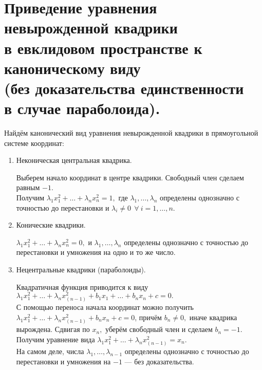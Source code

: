\documentclass[a4paper]{article}%
\renewcommand{\ab}{\par\noindent}%
\begin{document}
\section{Приведение уравнения невырожденной квадрики\\ в евклидовом пространстве к каноническому виду\\ (без
доказательства единственности\\ в случае параболоида).}
\label{q50}
Найдём канонический вид уравнения невырожденной квадрики в прямоугольной системе координат:
\begin{enumerate}
    \item Неконическая центральная квадрика.
    \ab Выберем начало координат в центре квадрики. Свободный член сделаем равным $-1$.\\
    Получим $\lambda_1x_1^2+\dots+\lambda_nx_n^2=1,$ где $\lambda_1,\dots,\lambda_n$ определены однозначно с
    точностью до перестановки и $\lambda_i\ne 0\ \ \forall\ i=1,\dots,n.$
    \item Конические квадрики.
    \ab $\lambda_1x_1^2+\dots+\lambda_nx_n^2=0,$ и $\lambda_1,\dots,\lambda_n$ определены однозначно с
    точностью до перестановки и умножения на одно и то же число.
    \item Нецентральные квадрики (параболоиды).
    \ab Квадратичная функция приводится к виду $\lambda_1x_1^2+\dots+\lambda_nx_(n-1)^2+b_1x_1+\dots+b_nx_n+c=0.$
    \\С помощью переноса начала координат можно получить $\lambda_1x_1^2+\dots+\lambda_nx_(n-1)^2+b_nx_n+c=0$, причём
    $b_n\ne 0,$ иначе квадрика вырождена. Сдвигая по $x_n,$ уберём свободный член и сделаем $b_n=-1.$ Получим уравнение
    вида $\lambda_1x_1^2+\dots+\lambda_nx_(n-1)^2=x_n.$\\ На самом деле, числа $\lambda_1,\dots,\lambda_{n-1}$ определены
    однозначно с точностью до перестановки и умножения на $-1$ --- без доказательства.
\end{enumerate}
\end{document}
